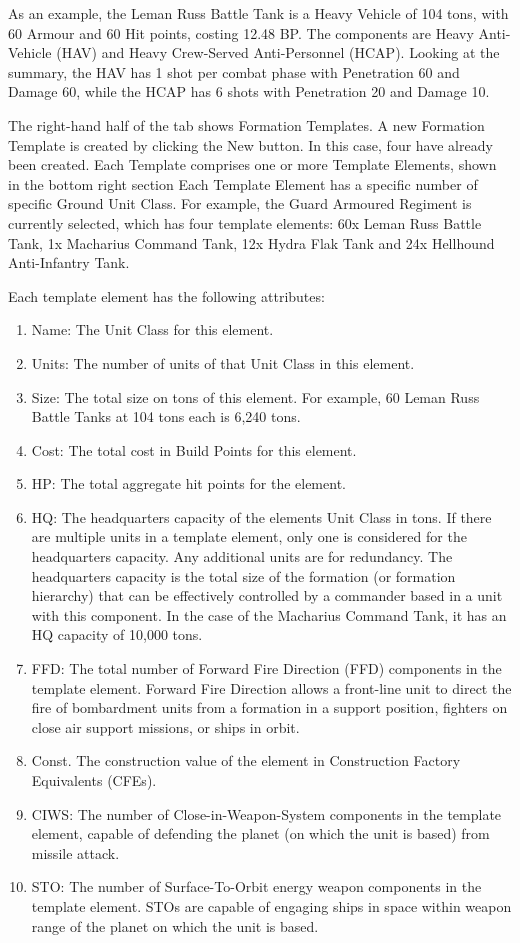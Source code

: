 \documentclass[../../Aurora C# unofficial manual.tex]{subfiles}
\begin{document}
	As an example, the Leman Russ Battle Tank is a Heavy Vehicle of 104 tons, with 60 Armour and 60 Hit points, costing 12.48 BP. The components are Heavy Anti-Vehicle (HAV) and Heavy Crew-Served Anti-Personnel (HCAP). Looking at the summary, the HAV has 1 shot per combat phase with Penetration 60 and Damage 60, while the HCAP has 6 shots with Penetration 20 and Damage 10.
	
	The right-hand half of the tab shows Formation Templates. A new Formation Template is created by clicking the New button. In this case, four have already been created. Each Template comprises one or more Template Elements, shown in the bottom right section Each Template Element has a specific number of specific Ground Unit Class. For example, the Guard Armoured Regiment is currently selected, which has four template elements: 60x Leman Russ Battle Tank, 1x Macharius Command Tank, 12x Hydra Flak Tank and 24x Hellhound Anti-Infantry Tank.
	
	Each template element has the following attributes:
	\begin{enumerate}
		\item Name: The Unit Class for this element.
		\item Units: The number of units of that Unit Class in this element.
		\item Size: The total size on tons of this element. For example, 60 Leman Russ Battle Tanks at 104 tons each is 6,240 tons.
		\item Cost: The total cost in Build Points for this element.
		\item HP: The total aggregate hit points for the element.
		\item HQ: The headquarters capacity of the elements Unit Class in tons. If there are multiple units in a template element, only one is considered for the headquarters capacity. Any additional units are for redundancy. The headquarters capacity is the total size of the formation (or formation hierarchy) that can be effectively controlled by a commander based in a unit with this component. In the case of the Macharius Command Tank, it has an HQ capacity of 10,000 tons.
		\item FFD: The total number of Forward Fire Direction (FFD) components in the template element. Forward Fire Direction allows a front-line unit to direct the fire of bombardment units from a formation in a support position, fighters on close air support missions, or ships in orbit.
		\item Const. The construction value of the element in Construction Factory Equivalents (CFEs).
		\item CIWS: The number of Close-in-Weapon-System components in the template element, capable of defending the planet (on which the unit is based) from missile attack.
		\item STO: The number of Surface-To-Orbit energy weapon components in the template element. STOs are capable of engaging ships in space within weapon range of the planet on which the unit is based.
	\end{enumerate} 
	
\end{document}
